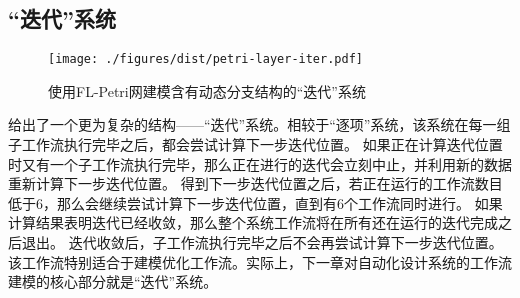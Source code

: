 \documentclass[index]{subfiles}
\begin{document}
\subsection{“迭代”系统}
\begin{figure}[h]
  \centering
  \texttt{[image: ./figures/dist/petri-layer-iter.pdf]}
  \caption{使用FL-Petri网建模含有动态分支结构的“迭代”系统\label{fig:petri-layer-iter}}
\end{figure}

给出了一个更为复杂的结构——“迭代”系统。相较于“逐项”系统，该系统在每一组子工作流执行完毕之后，都会尝试计算下一步迭代位置。
如果正在计算迭代位置时又有一个子工作流执行完毕，那么正在进行的迭代会立刻中止，并利用新的数据重新计算下一步迭代位置。
得到下一步迭代位置之后，若正在运行的工作流数目低于6，那么会继续尝试计算下一步迭代位置，直到有6个工作流同时进行。
如果计算结果表明迭代已经收敛，那么整个系统工作流将在所有还在运行的迭代完成之后退出。
迭代收敛后，子工作流执行完毕之后不会再尝试计算下一步迭代位置。
该工作流特别适合于建模优化工作流。实际上，下一章对自动化设计系统的工作流建模的核心部分就是“迭代”系统。
\end{document}
